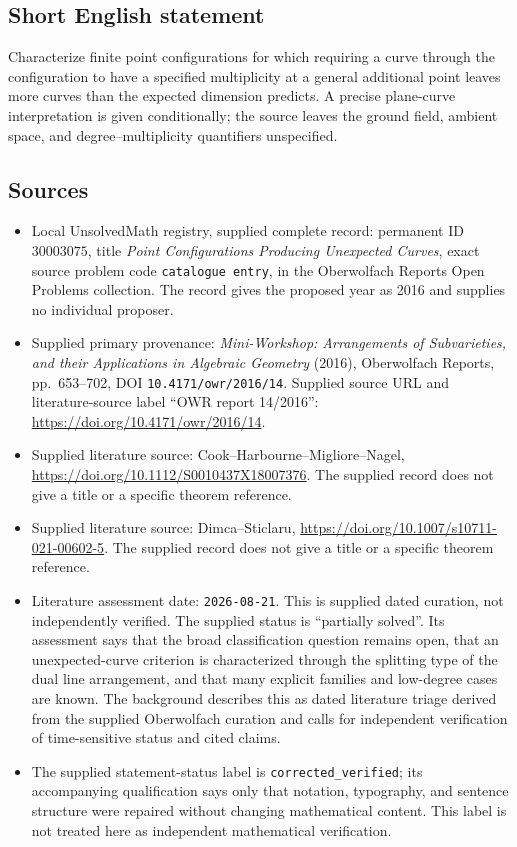 \documentclass[11pt]{article}
\begin{document}
\subsection{Short English statement}
Characterize finite point configurations for which requiring a curve through the configuration to have a specified multiplicity at a general additional point leaves more curves than the expected dimension predicts. A precise plane-curve interpretation is given conditionally; the source leaves the ground field, ambient space, and degree--multiplicity quantifiers unspecified.
\subsection{Sources}
\begin{itemize}
\item Local UnsolvedMath registry, supplied complete record: permanent ID \(30003075\), title \emph{Point Configurations Producing Unexpected Curves}, exact source problem code \texttt{catalogue entry}, in the Oberwolfach Reports Open Problems collection. The record gives the proposed year as 2016 and supplies no individual proposer.
\item Supplied primary provenance: \emph{Mini-Workshop: Arrangements of Subvarieties, and their Applications in Algebraic Geometry} (2016), Oberwolfach Reports, pp.~653--702, DOI \texttt{10.4171/owr/2016/14}. Supplied source URL and literature-source label ``OWR report 14/2016'': \url{https://doi.org/10.4171/owr/2016/14}.
\item Supplied literature source: Cook--Harbourne--Migliore--Nagel, \url{https://doi.org/10.1112/S0010437X18007376}. The supplied record does not give a title or a specific theorem reference.
\item Supplied literature source: Dimca--Sticlaru, \url{https://doi.org/10.1007/s10711-021-00602-5}. The supplied record does not give a title or a specific theorem reference.
\item Literature assessment date: \texttt{2026-08-21}. This is supplied dated curation, not independently verified. The supplied status is ``partially solved''. Its assessment says that the broad classification question remains open, that an unexpected-curve criterion is characterized through the splitting type of the dual line arrangement, and that many explicit families and low-degree cases are known. The background describes this as dated literature triage derived from the supplied Oberwolfach curation and calls for independent verification of time-sensitive status and cited claims.
\item The supplied statement-status label is \texttt{corrected\_verified}; its accompanying qualification says only that notation, typography, and sentence structure were repaired without changing mathematical content. This label is not treated here as independent mathematical verification.
\end{itemize}
\end{document}
